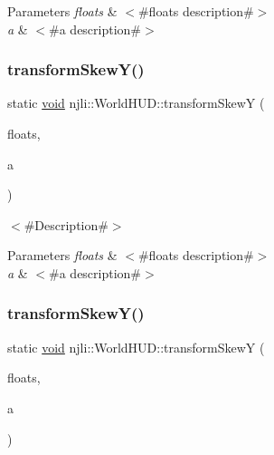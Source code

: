 \begin{DoxyParams}{Parameters}
{\em floats} & $<$\#floats description\#$>$ \\
\hline
{\em a} & $<$\#a description\#$>$ \\
\hline
\end{DoxyParams}
\mbox{\label{classnjli_1_1_world_h_u_d_a3d6e9ec19d114e055f265f1dfcf52a52}} 
\subsubsection{\texorpdfstring{transform\+Skew\+Y()}{transformSkewY()}\hspace{0.1cm}{\footnotesize\ttfamily [1/2]}}
{\footnotesize\ttfamily static \mbox{\hyperlink{_thread_8h_af1e856da2e658414cb2456cb6f7ebc66}{void}} njli\+::\+World\+H\+U\+D\+::transform\+SkewY (\begin{DoxyParamCaption}\item[{bt\+Matrix3x3 \&}]{floats,  }\item[{\mbox{\hyperlink{_util_8h_a5f6906312a689f27d70e9d086649d3fd}{f32}}}]{a }\end{DoxyParamCaption})\hspace{0.3cm}{\ttfamily [static]}}

$<$\#\+Description\#$>$


\begin{DoxyParams}{Parameters}
{\em floats} & $<$\#floats description\#$>$ \\
\hline
{\em a} & $<$\#a description\#$>$ \\
\hline
\end{DoxyParams}
\mbox{\label{classnjli_1_1_world_h_u_d_a60dd37a1e941ec7fb4de80d9715454d2}} 
\subsubsection{\texorpdfstring{transform\+Skew\+Y()}{transformSkewY()}\hspace{0.1cm}{\footnotesize\ttfamily [2/2]}}
{\footnotesize\ttfamily static \mbox{\hyperlink{_thread_8h_af1e856da2e658414cb2456cb6f7ebc66}{void}} njli\+::\+World\+H\+U\+D\+::transform\+SkewY (\begin{DoxyParamCaption}\item[{\mbox{\hyperlink{_util_8h_a5f6906312a689f27d70e9d086649d3fd}{f32}} $\ast$}]{floats,  }\item[{\mbox{\hyperlink{_util_8h_a5f6906312a689f27d70e9d086649d3fd}{f32}}}]{a }\end{DoxyParamCaption})\hspace{0.3cm}{\ttfamily [static]}}

